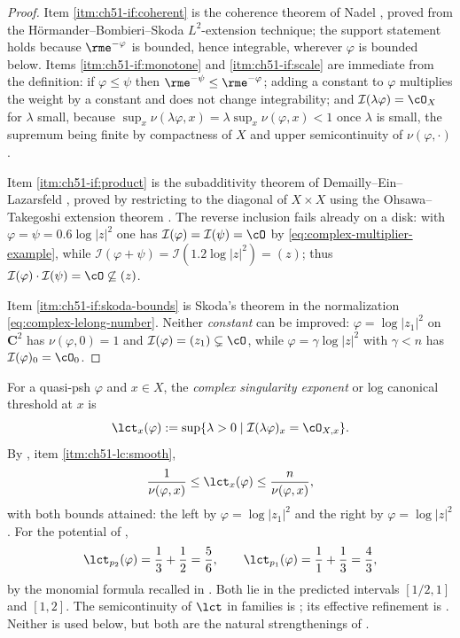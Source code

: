 \begin{proof}
Item \cref{itm:ch51-if:coherent} is the coherence theorem of Nadel
\cite{Nad89,Nad90}, proved from the H\"ormander--Bombieri--Skoda
\(L^2\)-extension technique; the support statement holds because
\(\rme^{-\varphi}\) is bounded, hence integrable, wherever \(\varphi\) is
bounded below.  Items \cref{itm:ch51-if:monotone} and
\cref{itm:ch51-if:scale} are immediate from the definition: if
\(\varphi\leq\psi\) then \(\rme^{-\psi}\leq\rme^{-\varphi}\); adding a
constant to \(\varphi\) multiplies the weight by a constant and does not
change integrability; and \(\mathcal I(\lambda\varphi)=\cO_X\) for
\(\lambda\) small, because \(\sup_x\nu(\lambda\varphi,x)
=\lambda\sup_x\nu(\varphi,x)<1\) once \(\lambda\) is small, the supremum
being finite by compactness of \(X\) and upper semicontinuity of
\(\nu(\varphi,\cdot)\).

Item \cref{itm:ch51-if:product} is the subadditivity theorem of
Demailly--Ein--Lazarsfeld \cite{DEL00}, proved by restricting to the
diagonal of \(X\times X\) using the Ohsawa--Takegoshi extension theorem
\cite{OT87}.  The reverse inclusion fails already on a disk: with
\(\varphi=\psi=0.6\log|z|^2\) one has
\(\mathcal I(\varphi)=\mathcal I(\psi)=\cO\) by
\eqref{eq:complex-multiplier-example}, while
\(\mathcal I(\varphi+\psi)=\mathcal I(1.2\log|z|^2)=(z)\); thus
\(\mathcal I(\varphi)\cdot\mathcal I(\psi)=\cO\not\subseteq(z)\).

Item \cref{itm:ch51-if:skoda-bounds} is Skoda's theorem \cite{Sko72} in the
normalization \eqref{eq:complex-lelong-number}.  Neither \emph{constant}
can be improved: \(\varphi=\log|z_1|^2\) on
\(\mathbf C^2\) has \(\nu(\varphi,0)=1\) and
\(\mathcal I(\varphi)=(z_1)\subsetneq\cO\), while
\(\varphi=\gamma\log|z|^2\) with \(\gamma<n\) has
\(\mathcal I(\varphi)_0=\cO_0\).
\end{proof}

\begin{example}
\label{ex:ch51-lct}
For a quasi-psh \(\varphi\) and \(x\in X\), the \emph{complex singularity
exponent} or log canonical threshold at \(x\) is
\[
 \lct_x(\varphi)
 :=\sup\{\lambda>0\mid \mathcal I(\lambda\varphi)_x=\cO_{X,x}\}.
\]
By , item \cref{itm:ch51-lc:smooth},
\[
 \frac{1}{\nu(\varphi,x)}\leq\lct_x(\varphi)\leq
 \frac{n}{\nu(\varphi,x)},
\]
with both bounds attained: the left by \(\varphi=\log|z_1|^2\) and the
right by \(\varphi=\log|z|^2\).  For the potential of
,
\[
 \lct_{p_2}(\varphi)=\frac13+\frac12=\frac56,
 \qquad
 \lct_{p_1}(\varphi)=\frac11+\frac13=\frac43 ,
\]
by the monomial formula recalled in .  Both lie in
the predicted intervals \([1/2,1]\) and \([1,2]\).  The
semicontinuity of \(\lct\) in families is \cite{DK01}; its
effective refinement is \cite{Hiep14}.  Neither is used below, but both
are the natural strengthenings of .
\end{example}

